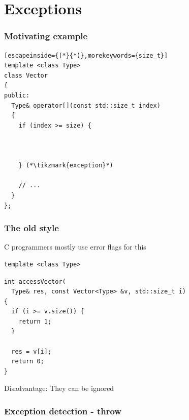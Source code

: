 \documentclass[14pt,a4paper,dvipsnames,usenames]{beamer}
\begin{document}
\section{Exceptions}

\frame[plain]{\sectionpage}

\begin{frame}[fragile]
  \frametitle{Motivating example}
  
  \begin{lstlisting}[escapeinside={(*}{*)},morekeywords={size_t}]
template <class Type>
class Vector
{
public:
  Type& operator[](const std::size_t index)
  {
    if (index >= size) {



    } (*\tikzmark{exception}*)

    // ... 
  }
};
  \end{lstlisting}

  \nointerlineskip

\end{frame}

\begin{frame}[fragile]
  \frametitle{The old style}

  C\; programmers mostly use error flags for this

  \vspace{.5em}
  \begin{lstlisting}[basicstyle=\ttfamily\fontsize{9pt}{8pt}\selectfont]
template <class Type>
  \end{lstlisting} \vspace*{-1ex}
  \begin{lstlisting}[basicstyle=\ttfamily\fontsize{9pt}{8pt}\selectfont,morekeywords={Type,Vector,size_t}]
int accessVector(
  Type& res, const Vector<Type> &v, std::size_t i)
{
  if (i >= v.size()) {
    return 1;
  }

  res = v[i];
  return 0;
}
  \end{lstlisting}

  \vspace{.5em}
  {\color{Marty}Disadvantage}: They can be ignored
  
\end{frame}

\begin{frame}[fragile]
  \frametitle{Exception detection - {\color{FeebleWeek}throw}}


  
\end{frame}
\end{document}
